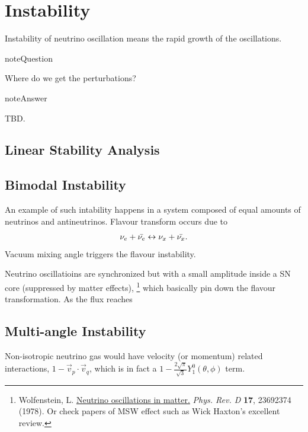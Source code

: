 \documentclass[letterpaper,12pt,english]{sphinxmanual}
\begin{document}
\chapter{Instability}
\label{instability:instability}\label{instability::doc}
Instability of neutrino oscillation means the rapid growth of the oscillations.

\begin{notice}{note}{Question}

Where do we get the perturbations?
\end{notice}

\begin{notice}{note}{Answer}

TBD.
\end{notice}


\section{Linear Stability Analysis}
\label{instability:index-0}\label{instability:linear-stability-analysis}

\section{Bimodal Instability}
\label{instability:bimodal-instability}\label{instability:index-1}
An example of such intability happens in a system composed of equal amounts of neutrinos and antineutrinos. Flavour transform occurs due to
\begin{gather}
\begin{split}\nu_e + \bar{\nu_e} \leftrightarrow \nu_x + \bar{\nu_x}.\end{split}\notag
\end{gather}
Vacuum mixing angle triggers the flavour instability.

Neutrino oscillatioins are synchronized but with a small amplitude inside a SN core (suppressed by matter effects), \footnote{
Wolfenstein, L. \href{http://journals.aps.org/prd/abstract/10.1103/PhysRevD.17.2369}{Neutrino oscillations in matter.} \emph{Phys. Rev. D} \textbf{17}, 23692374 (1978). Or check papers of MSW effect such as Wick Haxton's excellent review.
} which basically pin down the flavour transformation. As the flux reaches


\section{Multi-angle Instability}
\label{instability:index-2}\label{instability:multi-angle-instability}
Non-isotropic neutrino gas would have velocity (or momentum) related interactions, \(1-\vec v_p\cdot\vec v_q\), which is in fact a \(1 -\frac{2\sqrt{\pi}}{\sqrt{3}} Y_1^0(\theta,\phi)\) term.
\end{document}
